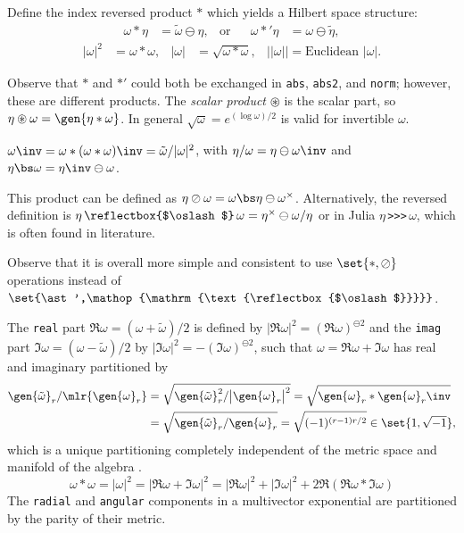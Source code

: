 \documentclass{juliacon}
\DeclareMathOperator*{\obackslash}{\text{\reflectbox{$\oslash$}}}
\begin{document}
\begin{definition}
	Define the index reversed product $\ast$ which yields a Hilbert space structure:
	\begin{align*}
		\omega\ast\eta &= \tilde\omega\ominus\eta, & \text{or} & & \omega\ast'\eta &= \omega\ominus\tilde\eta,
	\end{align*}
	\begin{align*}
		|\omega|^2 &= \omega\ast\omega, & |\omega| &= \sqrt{\omega\ast\omega}, & ||\omega|| = \text{Euclidean }|\omega|.
	\end{align*}
\end{definition}
\begin{remark}
	Observe that $\ast$ and $\ast'$ could both be exchanged in \verb`abs`, \verb`abs2`, and \verb`norm`; however, these are different products.
	The \textit{scalar product} $\circledast$ is the scalar part, so $\eta\circledast\omega = \gen{\eta\ast\omega}$.
	In general $\sqrt\omega = e^{(\log\omega)/2}$ is valid for invertible $\omega$.
\end{remark}
\begin{definition}[Inverse]
	$\omega\inv = \omega\ast(\omega\ast\omega)\inv = \tilde\omega/|\omega|^2$, with $\eta/\omega = \eta\ominus\omega\inv$ and %
	$\eta\bs\omega = \eta\inv\ominus\omega$.
\end{definition}
\begin{definition}
	This product can be defined as $\eta\oslash\omega = \omega\bs\eta\ominus\omega^\times$. Alternatively, the reversed definition is $\eta\obackslash\omega = \eta^\times\ominus\omega/\eta$ or in Julia $\eta\,$\verb`>>>`$\,\omega$, which is often found in literature.
\end{definition}
\begin{remark}
	Observe that it is overall more simple and consistent to use $\set{\ast,\oslash}$ operations instead of $\set{\ast',\obackslash}$.
\end{remark}
The \verb`real` part $\Re\omega = (\omega+\tilde\omega)/2$ is defined by $|\Re\omega|^2 = (\Re\omega)^{\ominus2}$ and the \verb`imag` part $\Im\omega = (\omega-\tilde\omega)/2$ by $|\Im\omega|^2 = -(\Im\omega)^{\ominus2}$, such that $\omega = \Re\omega+\Im\omega$ has real and imaginary partitioned by
\begin{align*}
	\gen{\tilde\omega}_r/\mlr{\gen{\omega}_r} &= \sqrt{\gen{\tilde\omega}_r^2/\big|\gen{\omega}_r\big|^2} = \sqrt{\gen{\omega}_r\ast\gen{\omega}_r\inv} \\
	&= \sqrt{\gen{\tilde\omega}_r/\gen{\omega}_r}=\sqrt{(-1)^{(r-1)r/2}} \in\set{1,\sqrt{-1}},
\end{align*}
which is a unique partitioning completely independent of the metric space and manifold of the algebra \cite{chappell-iqbal-gunn-abbott}.
$$ \omega\ast\omega = |\omega|^2 = |\Re\omega+\Im\omega|^2 = %
|\Re\omega|^2+|\Im\omega|^2 + 2\Re(\Re\omega\ast\Im\omega) $$
The \verb`radial` and \verb`angular` components in a multivector exponential are partitioned by the parity of their metric.
\end{document}
